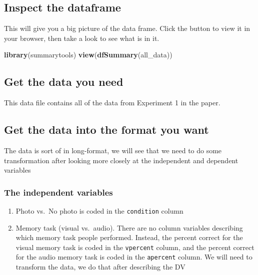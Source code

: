 \documentclass[
]{book}
\newenvironment{Shaded}{\begin{snugshade}}{\end{snugshade}}
\newcommand{\FunctionTok}[1]{\textcolor[rgb]{0.13,0.29,0.53}{\textbf{#1}}}
\newcommand{\NormalTok}[1]{#1}
\providecommand{\tightlist}{%
  \setlength{\itemsep}{0pt}\setlength{\parskip}{0pt}}
\begin{document}
\hypertarget{inspect-the-dataframe-3}{%
\subsection{Inspect the dataframe}\label{inspect-the-dataframe-3}}

This will give you a big picture of the data frame. Click the button to
view it in your browser, then take a look to see what is in it.

\begin{Shaded}
\begin{Highlighting}[]
\FunctionTok{library}\NormalTok{(summarytools)}
\FunctionTok{view}\NormalTok{(}\FunctionTok{dfSummary}\NormalTok{(all\_data))}
\end{Highlighting}
\end{Shaded}

\hypertarget{get-the-data-you-need-3}{%
\subsection{Get the data you need}\label{get-the-data-you-need-3}}

This data file contains all of the data from Experiment 1 in the paper.

\hypertarget{get-the-data-into-the-format-you-want-1}{%
\subsection{Get the data into the format you want}\label{get-the-data-into-the-format-you-want-1}}

The data is sort of in long-format, we will see that we need to do some
transformation after looking more closely at the independent and
dependent variables

\hypertarget{the-independent-variables-1}{%
\subsubsection{The independent variables}\label{the-independent-variables-1}}

\begin{enumerate}
\def\labelenumi{\arabic{enumi}.}
\tightlist
\item
  Photo vs.~No photo is coded in the \texttt{condition} column
\item
  Memory task (visual vs.~audio). There are no column variables
  describing which memory task people performed. Instead, the percent
  correct for the visual memory task is coded in the \texttt{vpercent}
  column, and the percent correct for the audio memory task is coded
  in the \texttt{apercent} column. We will need to transform the data, we do
  that after describing the DV
\end{enumerate}
\end{document}

